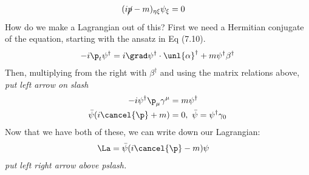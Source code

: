 \documentclass[a4paper, 11pt, normalem]{report}
\begin{document}
\begin{align}
    (i\cancel{p}-m)_{\eta\xi}\psi_{\xi} &= 0
\end{align}
How do we make a Lagrangian out of this?
First we need a Hermitian conjugate of the equation, starting with the ansatz in Eq (7.10).
\begin{align}
    -i\p_t\psi^\dagger &= i\grad\psi^\dagger\cdot\unl{\alpha}^\dagger + m\psi^\dagger\beta^\dagger\\
\end{align}
Then, multiplying from the right with $\beta^\dagger$ and using the matrix relations above, \textit{put left arrow on slash}
\begin{align}
    -i\psi^\dagger\p_\mu\gamma^\mu &= m\psi^\dagger \\
    \bar{\psi}(i\cancel{\p}+m) &= 0,~ \bar{\psi} = \psi^\dagger\gamma_0 
\end{align}
Now that we have both of these, we can write down our Lagrangian:
\begin{align}
    \La &= \bar{\psi}(i\cancel{\p}-m)\psi
\end{align}
\textit{put left right arrow above pslash.}

\chapter{}
\end{document}
